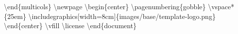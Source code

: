 \documentclass{article}%
\begin{document}
\textbackslash{}end\{multicols\}\newline%
\textbackslash{}newpage\newline%
\textbackslash{}begin\{center\}\newline%
\textbackslash{}pagenumbering\{gobble\}\newline%
\textbackslash{}vspace*\{25em\}\newline%
\textbackslash{}includegraphics{[}width=8cm{]}\{images/base/template{-}logo.png\}\newline%
\textbackslash{}end\{center\}\newline%
\textbackslash{}vfill\newline%
\textbackslash{}license\newline%
\textbackslash{}end\{document\}%
\end{document}
